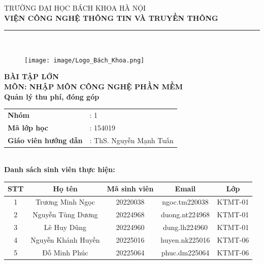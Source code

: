 \documentclass{article}
\begin{document}
\begin{titlepage}
\begin{Border}
    \begin{center}
        \vspace{-12pt} TRƯỜNG ĐẠI HỌC BÁCH KHOA HÀ NỘI \\
        \textbf{VIỆN CÔNG NGHỆ THÔNG TIN VÀ TRUYỀN THÔNG} \\
        \rule{0.8\textwidth}{0.5pt} \\[1cm]

        \begin{figure}[H]
            \centering
            \texttt{[image: image/Logo\_Bách\_Khoa.png]}
        \end{figure}
        
        \textbf{\fontsize{24pt}{0pt}\selectfont BÀI TẬP LỚN} \\[0.5cm]
        \textbf{\fontsize{14pt}{0pt}\selectfont MÔN: NHẬP MÔN CÔNG NGHỆ PHẦN MỀM} \\[1cm]
        
        {\fontsize{20pt}{0pt} \selectfont \textbf{Quản lý thu phí, đóng góp}} \\[1cm]
        
        \begin{tabular}{ll}
        \textbf{\fontsize{14pt}{0pt}\selectfont Nhóm} & \fontsize{14pt}{0pt}\selectfont : 1 \\
        \textbf{\fontsize{14pt}{0pt}\selectfont Mã lớp học} & \fontsize{14pt}{0pt}\selectfont : 154019 \\
        \textbf{\fontsize{14pt}{0pt}\selectfont Giáo viên hướng dẫn} & \fontsize{14pt}{0pt}\selectfont : ThS. Nguyễn Mạnh Tuấn \\
        \end{tabular} \\[1.5cm]
        
        \textbf{\fontsize{14pt}{0pt}\selectfont Danh sách sinh viên thực hiện:} \\[1cm]
        
        \begin{tabular}{|c|c|c|c|c|}
            \hline
            \textbf{STT} & \textbf{Họ tên} & \textbf{Mã sinh viên} & \textbf{Email} & \textbf{Lớp} \\ 
            \hline
            1 & Trương Minh Ngọc & 20220038 & ngoc.tm220038 & KTMT-01 \\ 
            \hline
            2 & Nguyễn Tùng Dương & 20224968 & duong.nt224968 & KTMT-01 \\ 
            \hline
            3 & Lê Huy Dũng & 20224960 & dung.lh224960 & KTMT-01 \\
            \hline
            4 & Nguyễn Khánh Huyền & 20225016 & huyen.nk225016 & KTMT-06 \\ 
            \hline
            5 & Đỗ Minh Phúc & 20225064 & phuc.dm225064 & KTMT-06 \\
            \hline
        \end{tabular}  


\end{center}
\end{Border}
\end{titlepage}
\end{document}
